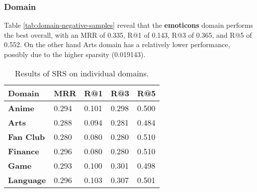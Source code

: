 \subsubsection{Domain}
Table \ref{tab:domain-negative-samples} reveal that the \textbf{emoticons} domain performs the best overall, with an MRR of 0.335, R@1 of 0.143, R@3 of 0.365, and R@5 of 0.552. On the other hand Arts domain has a relatively lower performance, possibly due to the higher sparsity (0.019143).
\begin{table}[h]
    \centering
    \caption{Results of SRS on individual domains.}
    \begin{tabular}{lllll}
    \toprule
    \textbf{Domain} & \textbf{MRR} & \textbf{R@1} & \textbf{R@3} & \textbf{R@5} \\
    \hline
    
     \textbf{Anime} 
     & 0.294 & 0.101 & 0.298 & 0.500 \\
    
    \textbf{Arts} 
   & 0.288 & 0.094 & 0.281 & 0.484 \\

    \textbf{Fan Club}
     & 0.280 & 0.080 & 0.280 & 0.510 \\

    \textbf{Finance} 
    & 0.296 & 0.080 & 0.280 & 0.510 \\
    
    \textbf{Game} 
     & 0.293 & 0.100 & 0.301 & 0.498  \\

     \textbf{Language} 
     & 0.296 & 0.103 & 0.307 & 0.501 \\
     

\end{tabular}
\end{table}
